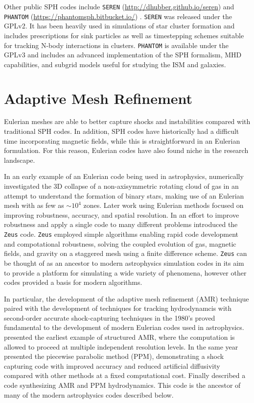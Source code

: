 \documentclass[11pt,twoside]{article}
\begin{document}
Other public SPH codes include \texttt{SEREN} ({\small \url{http://dhubber.github.io/seren}}) \citep{hubber2011} and \texttt{PHANTOM} ({\small \url{https://phantomsph.bitbucket.io/}}) \citep{price2017}. \texttt{SEREN} was released under the GPLv2. It has been heavily used in simulations of star cluster formation and includes prescriptions for sink particles \citep{walch2013} as well as timestepping schemes suitable for tracking N-body interactions in clusters. \texttt{PHANTOM} is available under the GPLv3 and includes an advanced implementation of the SPH formalism, MHD capabilities, and subgrid models useful for studying the ISM and galaxies.

\section{Adaptive Mesh Refinement}
\label{amr}

Eulerian meshes are able to better capture shocks and instabilities compared with traditional SPH codes. In addition, SPH codes have historically had a difficult time incorporating magnetic fields, while this is straightforward in an Eulerian formulation. For this reason, Eulerian codes have also found niche in the research landscape.

In an early example of an Eulerian code being used in astrophysics, \citet{boss1979} numerically investigated the 3D collapse of a non-axisymmetric rotating cloud of gas in an attempt to understand the formation of binary stars, making use of an Eulerian mesh with as few as ${\sim}10^4$ zones. Later work using Eulerian methods focused on improving robustness, accuracy, and spatial resolution. In an effort to improve robustness and apply a single code to many different problems \citet{stone1992} introduced the \texttt{Zeus} code. \texttt{Zeus} employed simple algorithms enabling rapid code development and compotational robustness, solving the coupled evolution of gas, magnetic fields, and gravity on a staggered mesh using a finite difference scheme. \texttt{Zeus} can be thought of as an ancestor to modern astrophysics simulation codes in its aim to provide a platform for simulating a wide variety of phenomena, however other codes provided a basis for modern algorithms.

In particular, the development of the adaptive mesh refinement (AMR) technique paired with the development of techniques for tracking hydrodynamcis with second-order accurate shock-capturing techniques in the 1980's proved fundamental to the development of modern Eulerian codes used in astrophysics. \citet{berger1984} presented the earliest example of structured AMR, where the computation is allowed to proceed at multiple independent resolution levels. In the same year \citet{colella1984} presented the piecewise parabolic method (PPM), demonstrating a shock capturing code with improved accuracy and reduced artificial diffusivity compared with other methods at a fixed computational cost. Finally \citet{berger1989} described a code synthesizing AMR and PPM hydrodynamics. This code is the ancestor of many of the modern astrophysics codes described below.
\end{document}
